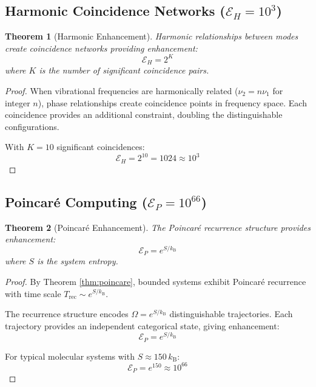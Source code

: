 \documentclass[twocolumn,10pt,twoside]{article}
\newtheorem{theorem}{Theorem}[section]
\newcommand{\Enh}{\mathcal{E}}
\newcommand{\kb}{k_{\mathrm{B}}}
\begin{document}
\subsection{Harmonic Coincidence Networks ($\Enh_H = 10^{3}$)}

\begin{theorem}[Harmonic Enhancement]
\label{thm:harmonic}
Harmonic relationships between modes create coincidence networks providing enhancement:
\begin{equation}
\Enh_H = 2^K
\end{equation}
where $K$ is the number of significant coincidence pairs.
\end{theorem}

\begin{proof}
When vibrational frequencies are harmonically related ($\nu_2 = n \nu_1$ for integer $n$), phase relationships create coincidence points in frequency space. Each coincidence provides an additional constraint, doubling the distinguishable configurations.

With $K = 10$ significant coincidences:
\begin{equation}
\Enh_H = 2^{10} = 1024 \approx 10^3
\end{equation}
\end{proof}

\subsection{Poincar\'{e} Computing ($\Enh_P = 10^{66}$)}

\begin{theorem}[Poincar\'{e} Enhancement]
\label{thm:poincare_enhancement}
The Poincar\'{e} recurrence structure provides enhancement:
\begin{equation}
\Enh_P = e^{S/\kb}
\end{equation}
where $S$ is the system entropy.
\end{theorem}

\begin{proof}
By Theorem \ref{thm:poincare}, bounded systems exhibit Poincar\'{e} recurrence with time scale $T_{\text{rec}} \sim e^{S/\kb}$.

The recurrence structure encodes $\Omega = e^{S/\kb}$ distinguishable trajectories. Each trajectory provides an independent categorical state, giving enhancement:
\begin{equation}
\Enh_P = e^{S/\kb}
\end{equation}

For typical molecular systems with $S \approx 150 \, \kb$:
\begin{equation}
\Enh_P = e^{150} \approx 10^{66}
\end{equation}
\end{proof}
\end{document}
